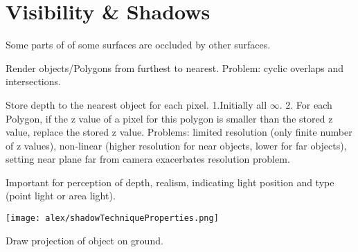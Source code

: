 \section{Visibility \& Shadows}

 Some parts of of some surfaces are occluded by other surfaces.

 Render objects/Polygons from furthest to nearest. Problem: cyclic overlaps and intersections.

 Store depth to the nearest object for each pixel. 1.Initially all $\infty$. 2. For each Polygon, if the z value of a pixel for this polygon is smaller than the stored z value, replace the stored z value. Problems: limited resolution (only finite number of z values), non-linear (higher resolution for near objects, lower for far objects), setting near plane far from camera exacerbates resolution problem.

 Important for perception of depth, realism, indicating light position and type (point light or area light).

\texttt{[image: alex/shadowTechniqueProperties.png]}
    
 Draw projection of object on ground.

